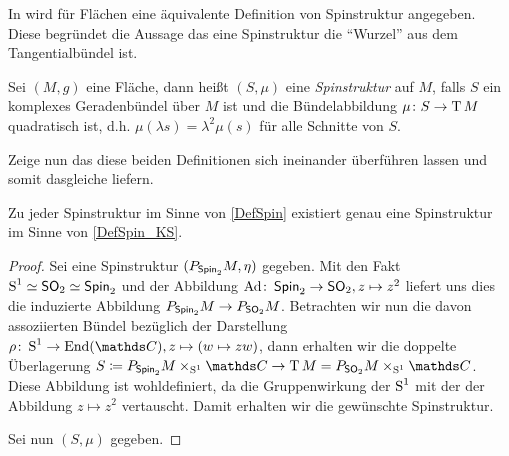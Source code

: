 In \cite{KS96} wird für Flächen eine äquivalente Definition
von Spinstruktur angegeben. Diese begründet die Aussage das
eine Spinstruktur die \enquote{Wurzel} aus dem Tangentialbündel ist.

\begin{Def}\label{DefSpin_KS}
	Sei $ (M,g) $ eine Fläche, dann heißt $ (S,\mu) $ eine
	\textit{Spinstruktur} auf $ M $, falls $ S $ ein komplexes Geradenbündel
	über $ M $ ist und die Bündelabbildung $ \abb{\mu}{S}{\TT M} $ quadratisch	ist, d.h. $ \mu(\lambda s) = \lambda^2 \mu(s) $ für alle Schnitte
	von $ S $.
\end{Def}

Zeige nun das diese beiden Definitionen sich ineinander überführen
lassen und somit dasgleiche liefern.

\begin{Satz}
	Zu jeder Spinstruktur im Sinne von \cref{DefSpin} existiert
	genau eine Spinstruktur im Sinne von \cref{DefSpin_KS}.
	\begin{proof}
		Sei eine Spinstruktur $ (\Ph{\spin_2}{M},\eta) $ gegeben.
		Mit den Fakt $ \S^1\simeq\so_2\simeq\spin_2 $ und der Abbildung
		$ \abb{\Ad}{\spin_2}{\so_2},z\mapsto z^2 $ liefert uns dies
		die induzierte Abbildung $ \Ph{\spin_2}{M}\rightarrow \Ph{\so_2}{M} $. Betrachten wir nun die davon assoziierten
		Bündel bezüglich der Darstellung $ \abb{\rho}{\S^1}{\End(\c)}, z\mapsto (w \mapsto zw) $, dann erhalten wir die doppelte
		Überlagerung $ S\coloneqq \Ph{\spin_2}{M}\times_{\S^1}\c \rightarrow {\TT M = \Ph{\so_2}{M}\times_{\S^1}\c} $. Diese Abbildung ist wohldefiniert, da die Gruppenwirkung der $ \S^1 $ mit der
	    der Abbildung $ z\mapsto z^2 $ vertauscht. Damit erhalten
	    wir die gewünschte Spinstruktur.
	    
	    Sei nun $ (S,\mu) $ gegeben. 
	    
		
	\end{proof}
\end{Satz}



